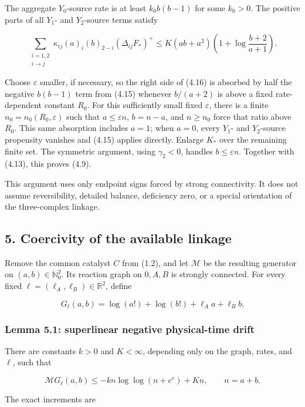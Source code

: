 The aggregate \(Y_0\)-source rate is at least \(k_0b(b-1)\) for some
\(k_0>0\). The positive parts of all \(Y_1\)- and \(Y_2\)-source terms
satisfy

\[
 \sum_{\substack{i=1,2\\i\to j}}
 \kappa_{ij}(a)_i(b)_{2-i}(\Delta_{ij}F_*)^+
 \le K(ab+a^2)
       \left(1+\log\frac{b+2}{a+1}\right).
\tag{4.16}
\]

Choose \(\varepsilon\) smaller, if necessary, so the right side of
(4.16) is absorbed by half the negative \(b(b-1)\) term from (4.15)
whenever \(b/(a+2)\) is above a fixed rate-dependent constant \(R_0\).
For this sufficiently small fixed \(\varepsilon\), there is a finite
\(n_0=n_0(R_0,\varepsilon)\) such that \(a\le\varepsilon n\), \(b=n-a\),
and \(n\ge n_0\) force that ratio above \(R_0\). This same absorption
includes \(a=1\); when \(a=0\), every \(Y_1\)- and \(Y_2\)-source
propensity vanishes and (4.15) applies directly. Enlarge \(K_*\) over
the remaining finite set. The symmetric argument, using \(\gamma_2<0\),
handles \(b\le\varepsilon n\). Together with (4.13), this proves (4.9).

This argument uses only endpoint signs forced by strong connectivity. It
does not assume reversibility, detailed balance, deficiency zero, or a
special orientation of the three-complex linkage.

\subsection{5. Coercivity of the available
linkage}

Remove the common catalyst \(C\) from (1.2), and let \(\mathcal M\) be
the resulting generator on \((a,b)\in\mathbb N_0^2\). Its reaction graph
on \(0,A,B\) is strongly connected. For every fixed
\(\ell=(\ell_A,\ell_B)\in\mathbb R^2\), define

\[
 G_\ell(a,b)=\log(a!)+\log(b!)+\ell_Aa+\ell_Bb.
\tag{5.1}
\]

\subsubsection{Lemma 5.1: superlinear negative physical-time
drift}

There are constants \(k>0\) and \(K<\infty\), depending only on the
graph, rates, and \(\ell\), such that

\[
 \mathcal MG_\ell(a,b)
 \le-kn\log\log(n+e^e)+Kn,\qquad n=a+b.
\tag{5.2}
\]

The exact increments are

